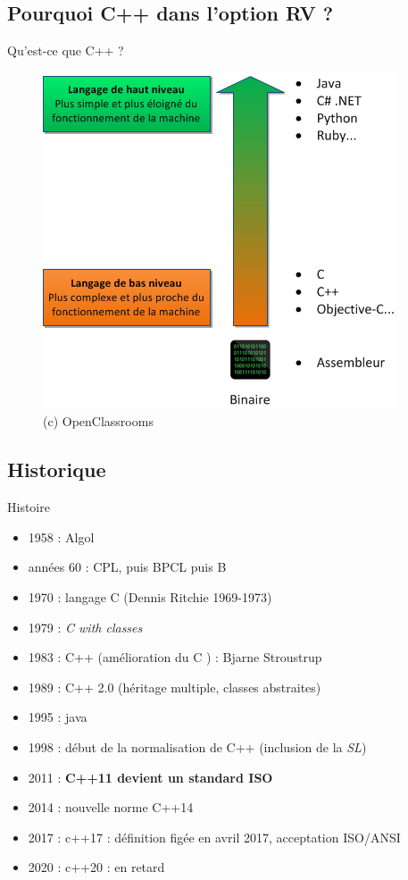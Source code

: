 
\subsection{Pourquoi C++ dans l'option RV ?}

\begin{frame}{Qu'est-ce que C++ ?}
\begin{figure}[htbp]
\begin{center}
   \includegraphics[scale=0.6]{fig/langages.png}
   \caption{(c) OpenClassrooms}
\end{center}
\end{figure}
\end{frame}

\subsection{Historique}

\begin{frame}{Histoire}
\begin{itemize}
\item 1958 : Algol
\item années 60 : CPL, puis BPCL puis B
\item 1970 : langage C (Dennis Ritchie 1969-1973)
\item 1979 : \textit{C with classes}
\item 1983 : C++ (amélioration du C ) : Bjarne Stroustrup
\item 1989 : C++ 2.0 (héritage multiple, classes abstraites)
\item 1995 : java
\item 1998 : début de la normalisation de C++ (inclusion de la \textit{SL})
\item 2011 : \textbf{C++11 devient un standard ISO}
\item 2014 : nouvelle norme C++14
\item 2017 : c++17 : définition figée en avril 2017, acceptation ISO/ANSI
\item 2020 : c++20 : en retard
\end{itemize}
\end{frame}

